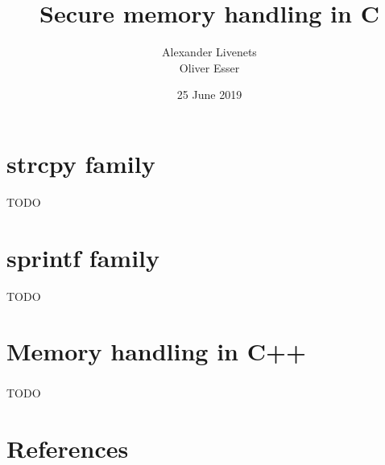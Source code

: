 \documentclass[usenames,dvipsnames]{beamer}
\title{Secure memory handling in C}
\subtitle{}
\author{Alexander Livenets\\Oliver Esser}
\institute{}
\date{25 June 2019}
\begin{document}


\begin{frame}
\titlepage
\end{frame}

\section{strcpy family}
\begin{frame}
TODO
\end{frame}

\section{sprintf family}
\begin{frame}
TODO
\end{frame}

\section{Memory handling in C++}
\begin{frame}
\frametitle{\secname}
TODO
\end{frame}

\section{References}
\begin{frame}
\frametitle{\secname}
\end{frame}

\end{document}

